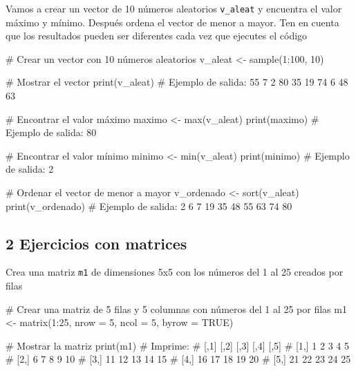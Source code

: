 \documentclass[
  letterpaper,
]{scrbook}
\newenvironment{Shaded}{\begin{snugshade}}{\end{snugshade}}
\newcommand{\AttributeTok}[1]{\textcolor[rgb]{0.40,0.45,0.13}{#1}}
\newcommand{\CommentTok}[1]{\textcolor[rgb]{0.37,0.37,0.37}{#1}}
\newcommand{\ConstantTok}[1]{\textcolor[rgb]{0.56,0.35,0.01}{#1}}
\newcommand{\DecValTok}[1]{\textcolor[rgb]{0.68,0.00,0.00}{#1}}
\newcommand{\FunctionTok}[1]{\textcolor[rgb]{0.28,0.35,0.67}{#1}}
\newcommand{\NormalTok}[1]{\textcolor[rgb]{0.00,0.23,0.31}{#1}}
\newcommand{\OtherTok}[1]{\textcolor[rgb]{0.00,0.23,0.31}{#1}}
\newcommand{\SpecialCharTok}[1]{\textcolor[rgb]{0.37,0.37,0.37}{#1}}
\begin{document}
Vamos a crear un vector de 10 números aleatorios \texttt{v\_aleat} y
encuentra el valor máximo y mínimo. Después ordena el vector de menor a
mayor. Ten en cuenta que los resultados pueden ser diferentes cada vez
que ejecutes el código

\begin{Shaded}
\begin{Highlighting}[]
\CommentTok{\# Crear un vector con 10 números aleatorios}
\NormalTok{v\_aleat }\OtherTok{\textless{}{-}} \FunctionTok{sample}\NormalTok{(}\DecValTok{1}\SpecialCharTok{:}\DecValTok{100}\NormalTok{, }\DecValTok{10}\NormalTok{)}

\CommentTok{\# Mostrar el vector}
\FunctionTok{print}\NormalTok{(v\_aleat)}
\CommentTok{\# Ejemplo de salida: 55  7  2  80 35 19 74  6 48 63}

\CommentTok{\# Encontrar el valor máximo}
\NormalTok{maximo }\OtherTok{\textless{}{-}} \FunctionTok{max}\NormalTok{(v\_aleat)}
\FunctionTok{print}\NormalTok{(maximo)}
\CommentTok{\# Ejemplo de salida: 80}

\CommentTok{\# Encontrar el valor mínimo}
\NormalTok{minimo }\OtherTok{\textless{}{-}} \FunctionTok{min}\NormalTok{(v\_aleat)}
\FunctionTok{print}\NormalTok{(minimo)}
\CommentTok{\# Ejemplo de salida: 2}

\CommentTok{\# Ordenar el vector de menor a mayor}
\NormalTok{v\_ordenado }\OtherTok{\textless{}{-}} \FunctionTok{sort}\NormalTok{(v\_aleat)}
\FunctionTok{print}\NormalTok{(v\_ordenado)}
\CommentTok{\# Ejemplo de salida: 2  6  7 19 35 48 55 63 74 80}
\end{Highlighting}
\end{Shaded}

\hypertarget{ejercicios-con-matrices-1}{%
\subsection{2 Ejercicios con matrices}\label{ejercicios-con-matrices-1}}

Crea una matriz \texttt{m1} de dimensiones 5x5 con los números del 1 al
25 creados por filas

\begin{Shaded}
\begin{Highlighting}[]
\CommentTok{\# Crear una matriz de 5 filas y 5 columnas con números del 1 al 25 por filas}
\NormalTok{m1 }\OtherTok{\textless{}{-}} \FunctionTok{matrix}\NormalTok{(}\DecValTok{1}\SpecialCharTok{:}\DecValTok{25}\NormalTok{, }\AttributeTok{nrow =} \DecValTok{5}\NormalTok{, }\AttributeTok{ncol =} \DecValTok{5}\NormalTok{, }\AttributeTok{byrow =} \ConstantTok{TRUE}\NormalTok{)}

\CommentTok{\# Mostrar la matriz}
\FunctionTok{print}\NormalTok{(m1)}
\CommentTok{\# Imprime:}
\CommentTok{\#      [,1] [,2] [,3] [,4] [,5]}
\CommentTok{\# [1,]    1    2    3    4    5}
\CommentTok{\# [2,]    6    7    8    9   10}
\CommentTok{\# [3,]   11   12   13   14   15}
\CommentTok{\# [4,]   16   17   18   19   20}
\CommentTok{\# [5,]   21   22   23   24   25}
\end{Highlighting}
\end{Shaded}
\end{document}
